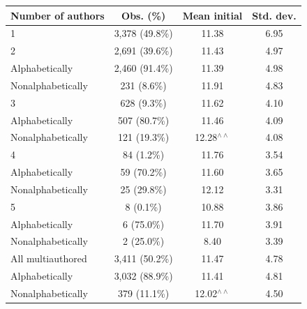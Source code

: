 \begin{tabular}{l *{3}{c}}
\toprule
Number of authors & Obs. (\%) & Mean initial & Std. dev. \\
\midrule
1 & 3,378 (49.8\%) & 11.38 & 6.95 \\
\hline
2 & 2,691 (39.6\%) & 11.43 & 4.97 \\
\quad Alphabetically & 2,460 (91.4\%) & 11.39 & 4.98 \\
\quad Nonalphabetically & 231 (8.6\%) & 11.91 & 4.83 \\
\hline
3 & 628 (9.3\%) & 11.62 & 4.10 \\
\quad Alphabetically & 507 (80.7\%) & 11.46 & 4.09 \\
\quad Nonalphabetically & 121 (19.3\%) & 12.28$^{\wedge\wedge}$ & 4.08 \\
\hline
4 & 84 (1.2\%) & 11.76 & 3.54 \\
\quad Alphabetically & 59 (70.2\%) & 11.60 & 3.65 \\
\quad Nonalphabetically & 25 (29.8\%) & 12.12 & 3.31 \\
\hline
5 & 8 (0.1\%) & 10.88 & 3.86 \\
\quad Alphabetically & 6 (75.0\%) & 11.70 & 3.91 \\
\quad Nonalphabetically & 2 (25.0\%) & 8.40 & 3.39 \\
\hline
All multiauthored & 3,411 (50.2\%) & 11.47 & 4.78 \\
\quad Alphabetically & 3,032 (88.9\%) & 11.41 & 4.81 \\
\quad Nonalphabetically & 379 (11.1\%) & 12.02$^{\wedge\wedge}$ & 4.50 \\
\bottomrule
\end{tabular}
